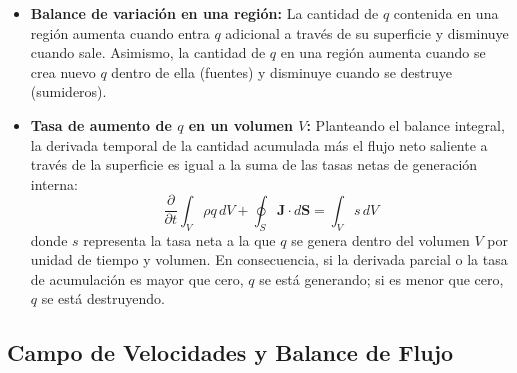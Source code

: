 \documentclass[11pt,letterpaper]{article}
\begin{document}
\begin{itemize}
\begin{equation}
    \end{equation}
    \item \textbf{Balance de variación en una región:} La cantidad de $q$ contenida en una región aumenta cuando entra $q$ adicional a través de su superficie y disminuye cuando sale. Asimismo, la cantidad de $q$ en una región aumenta cuando se crea nuevo $q$ dentro de ella (fuentes) y disminuye cuando se destruye (sumideros).
    \item \textbf{Tasa de aumento de $q$ en un volumen $V$:} Planteando el balance integral, la derivada temporal de la cantidad acumulada más el flujo neto saliente a través de la superficie es igual a la suma de las tasas netas de generación interna:
    \begin{equation}
        \frac{\partial}{\partial t} \int_V \rho q \, dV + \oint_S \mathbf{J} \cdot d\mathbf{S} = \int_V s \, dV
    \end{equation}
    donde $s$ representa la tasa neta a la que $q$ se genera dentro del volumen $V$ por unidad de tiempo y volumen. En consecuencia, si la derivada parcial o la tasa de acumulación es mayor que cero, $q$ se está generando; si es menor que cero, $q$ se está destruyendo.
\end{itemize}

\subsection{Campo de Velocidades y Balance de Flujo}
\end{document}
